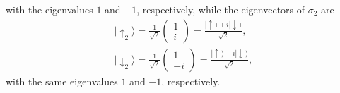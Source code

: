 \documentclass[12pt]{article}
\begin{document}
with the eigenvalues $1$ and $-1$, respectively, while the 
eigenvectors of $\sigma_2$ are
\begin{eqnarray}\label{basis2}
& |\!\uparrow_2\rangle=\frac{1}{\sqrt{2}}
\left( \begin{array}{c} 1 \\ 
                        i \end{array} \right)=
\displaystyle\frac{
|\!\uparrow\,\rangle + i|\!\downarrow\,\rangle }{\sqrt{2}} , &
\nonumber \\
& |\!\downarrow_2\rangle=\frac{1}{\sqrt{2}}
\left( \begin{array}{c} 1 \\
                        -i \end{array} \right)=
\displaystyle\frac{
|\!\uparrow\,\rangle - i|\!\downarrow\,\rangle }{\sqrt{2}} , &  
\end{eqnarray}
with the same eigenvalues $1$ and $-1$, respectively. 
 
\end{document}
